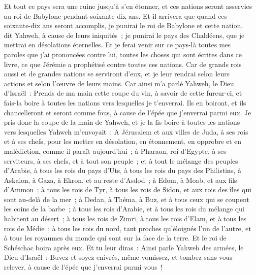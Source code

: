 \begin{multicols}{2}
Et tout ce pays sera une ruine jusqu'à s'en étonner, et ces nations seront asservies au roi de Babylone pendant soixante-dix ans.
Et il arrivera que quand ces soixante-dix ans seront accomplis, je punirai le roi de Babylone et cette nation, dit Yahweh, à cause de leurs iniquités~; je punirai le pays des Chaldéens, que je mettrai en désolations éternelles.
Et je ferai venir sur ce pays-là toutes mes paroles que j'ai prononcées contre lui, toutes les choses qui sont écrites dans ce livre, ce que Jérémie a prophétisé contre toutes ces nations.
Car de grands rois aussi et de grandes nations se serviront d'eux, et je leur rendrai selon leurs actions et selon l'œuvre de leurs mains.
Car ainsi m'a parlé Yahweh, le Dieu d'Israël~: Prends de ma main cette coupe du vin, à savoir de cette fureur-ci, et fais-la boire à toutes les nations vers lesquelles je t'enverrai.
Ils en boiront, et ils chancelleront et seront comme fous, à cause de l'épée que j'enverrai parmi eux.
Je pris donc la coupe de la main de Yahweh, et je la fis boire à toutes les nations vers lesquelles Yahweh m'envoyait~:
A Jérusalem et aux villes de Juda, à ses rois et à ses chefs, pour les mettre en désolation, en étonnement, en opprobre et en malédiction, comme il paraît aujourd'hui~;
à Pharaon, roi d'Egypte, à ses serviteurs, à ses chefs, et à tout son peuple~;
et à tout le mélange des peuples d'Arabie, à tous les rois du pays d'Uts, à tous les rois du pays des Philistins, à Askalon, à Gaza, à Ekron, et au reste d'Asdod~;
à Edom, à Moab, et aux fils d'Ammon~;
à tous les rois de Tyr, à tous les rois de Sidon, et aux rois des îles qui sont au-delà de la mer~;
à Dedan, à Théma, à Buz, et à tous ceux qui se coupent les coins de la barbe~;
à tous les rois d'Arabie, et à tous les rois du mélange qui habitent au désert~;
à tous les rois de Zimri, à tous les rois d'Elam, et à tous les rois de Médie~;
à tous les rois du nord, tant proches qu'éloignés l'un de l'autre, et à tous les royaumes du monde qui sont sur la face de la terre. Et le roi de Schéschac boira après eux.
Et tu leur diras~: Ainsi parle Yahweh des armées, le Dieu d'Israël~: Buvez et soyez enivrés, même vomissez, et tombez sans vous relever, à cause de l'épée que j'enverrai parmi vous~!

\end{multicols}
